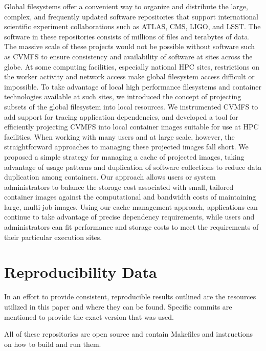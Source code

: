 \documentclass[sigconf]{acmart}
\begin{document}
Global filesystems offer a convenient way to organize and distribute the large, complex, and frequently updated software repositories that support international scientific experiment collaborations such as ATLAS, CMS, LIGO, and LSST.
The software in these repositories consists of millions of files and terabytes of data.
The massive scale of these projects would not be possible without software such as CVMFS to ensure consistency and availability of software at sites across the globe.
At some computing facilities, especially national HPC sites,
restrictions on the worker activity and network access make global filesystem access difficult or impossible.
To take advantage of local high performance filesystems and container technologies available at such sites,
we introduced the concept of projecting subsets of the global filesystem into local resources.
We instrumented CVMFS to add support for tracing application dependencies,
and developed a tool for efficiently projecting CVMFS into local container images suitable for use at HPC facilities.
When working with many users and at large scale, however,
the straightforward approaches to managing these projected images fall short.
We proposed a simple strategy for managing a cache of projected images,
taking advantage of usage patterns and duplication of software collections to reduce data duplication among containers.
Our approach allows users or system administrators to balance the storage cost associated with small, tailored container images against the computational and bandwidth costs of maintaining large, multi-job images.
Using our cache management approach,
applications can continue to take advantage of precise dependency requirements,
while users and administrators can fit performance and storage costs to meet the requirements of their particular execution sites.

\section{Reproducibility Data}

In an effort to provide consistent, reproducible results outlined are the
resources utilized in this paper and where they can be found.
Specific commits are mentioned to provide the exact version that was used.


All of these repositories are open source and contain Makefiles
and instructions on how to build and run them.
\fi





\end{document}
